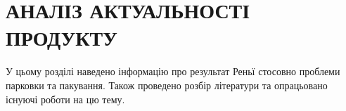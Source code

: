 \chapter{АНАЛІЗ АКТУАЛЬНОСТІ ПРОДУКТУ} 

\hspace{10pt}

У цьому розділі наведено інформацію про результат Реньї стосовно проблеми парковки та пакування. Також проведено розбір літератури та опрацьовано існуючі роботи на цю тему.






	